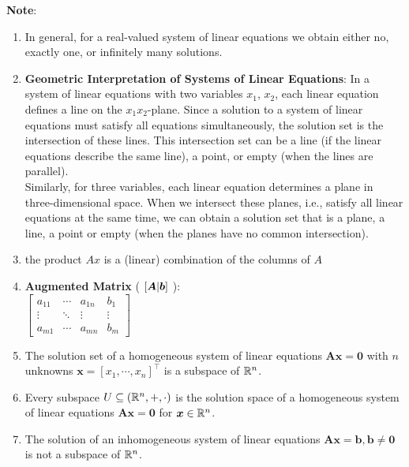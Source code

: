 \begin{enumerate}
\end{enumerate}


\vspace{0.5cm}
\textbf{Note}:
\begin{enumerate}
    \item In general, for a real-valued system of linear equations we obtain either no, exactly one, or infinitely many solutions.
    \hfill \cite{mfml/book/mml/Deisenroth-Faisal-Ong}

    \item \textbf{Geometric Interpretation of Systems of Linear Equations}:
    In a system of linear equations with two variables $x_1$, $x_2$, each linear equation defines a line on the $x_1x_2$-plane. Since a solution to a system of linear equations must satisfy all equations simultaneously, the solution set is the intersection of these lines. This intersection set can be a line (if the linear equations describe the same line), a point, or empty (when the lines are parallel).
    \hfill \cite{mfml/book/mml/Deisenroth-Faisal-Ong}
    \\
    Similarly, for three variables, each linear equation determines a plane in three-dimensional space. When we intersect these planes, i.e., satisfy all linear equations at the same time, we can obtain a solution set that is a plane, a line, a point or empty (when the planes have no common intersection).
    \hfill \cite{mfml/book/mml/Deisenroth-Faisal-Ong}

    \item the product $Ax$ is a (linear) combination of the columns of $A$
    \hfill \cite{mfml/book/mml/Deisenroth-Faisal-Ong}

    \item \textbf{Augmented Matrix} ( $\left[\bm{A}|\bm{b}\right]$ ):
    \\[0.2cm]
    $
        \left[
        \begin{array}{ccc|c}
            a_{11} & \cdots & a_{1n} & b_{1}\\
            \vdots & \ddots & \vdots & \vdots \\
            a_{m1} & \cdots & a_{mn} & b_{m}
        \end{array}
        \right]
    $

    \item The solution set of a homogeneous system of linear equations $\bm{Ax} = \bm{0}$ with $n$ unknowns $\bm{x} = [x_1, \cdots , x_n]^\top$ is a subspace of $\mathbb{R}^n$.
    \hfill \cite{mfml/book/mml/Deisenroth-Faisal-Ong}

    \item Every subspace $U \subseteq (\mathbb{R}^n , +, \cdot)$ is the solution space of a homogeneous system of linear equations $\bm{Ax} = \bm{0}$ for $\bm{x} \in \mathbb{R}^n$.
    \hfill \cite{mfml/book/mml/Deisenroth-Faisal-Ong}

    \item The solution of an inhomogeneous system of linear equations $\bm{Ax} = \bm{b}, \bm{b} \neq \bm{0}$ is not a subspace of $\mathbb{R}^n$.
    \hfill \cite{mfml/book/mml/Deisenroth-Faisal-Ong}


\end{enumerate}
